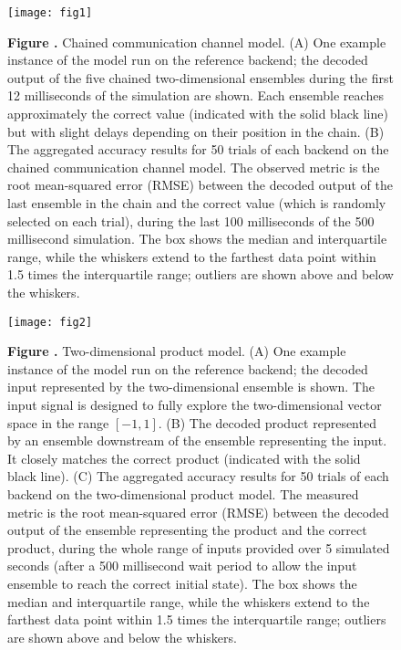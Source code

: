 \documentclass{frontiersSCNS}
\providecommand{\DIFaddbeginFL}{} %
\providecommand{\DIFaddendFL}{} %
\providecommand{\DIFdelbeginFL}{} %
\providecommand{\DIFdelendFL}{} %
\begin{document}
\begin{figure}[!ht]
\begin{center}
  \DIFdelbeginFL %
\DIFdelendFL \DIFaddbeginFL \texttt{[image: fig1]}
\DIFaddendFL \end{center}
\textbf{\label{fig:01} Figure .}
       {Chained communication channel model. (A) One example instance
         of the model run on the reference backend; the decoded output
         of the five chained two-dimensional ensembles during the first
         12 milliseconds of the simulation are shown.
         Each ensemble reaches approximately the correct value
         (indicated with the solid black line)
         but with slight delays depending on their position in the chain.
         (B) The aggregated accuracy results for
         50 trials of each backend on the
         chained communication channel model. The observed metric is the root
         mean-squared error (RMSE) between the decoded output of the last
         ensemble in the chain and the correct value (which is randomly
         selected on each trial), during the last 100 milliseconds of the
         500 millisecond simulation. The box shows the median and
         interquartile range, while the whiskers extend to the farthest
         data point within 1.5 times the interquartile range;
         outliers are shown above and below the whiskers.}
\end{figure}

\begin{figure}[!ht]
\begin{center}
  \DIFdelbeginFL %
\DIFdelendFL \DIFaddbeginFL \texttt{[image: fig2]}
\DIFaddendFL \end{center}
\textbf{\label{fig:02} Figure .}
       {Two-dimensional product model. (A) One example instance of the model
         run on the reference backend; the decoded input represented
         by the two-dimensional ensemble is shown. The input signal is
         designed to fully explore the two-dimensional vector space
         in the range $[-1, 1]$.
         (B) The decoded product represented by an ensemble downstream
         of the ensemble representing the input. It closely matches the
         correct product (indicated with the solid black line).
         (C) The aggregated accuracy results for 50 trials of
         each backend on the
         two-dimensional product model. The measured metric is the root
         mean-squared error (RMSE) between the decoded output of the ensemble
         representing the product and the correct product, during the whole
         range of inputs provided over 5 simulated seconds (after a 500
         millisecond wait period to allow the input ensemble to reach the
         correct initial state). The box shows the median and
         interquartile range, while the whiskers extend to the farthest
         data point within 1.5 times the interquartile range;
         outliers are shown above and below the whiskers.}
\end{figure}
\end{document}
